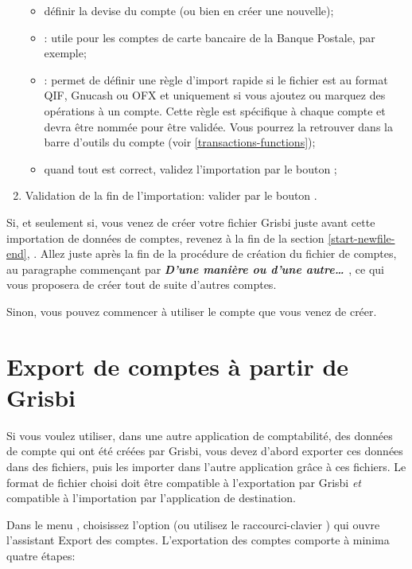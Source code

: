 \begin{enumerate}
\begin{itemize}
			\item définir la devise du compte (ou bien en créer une nouvelle);
			\item {}: utile pour les comptes de carte bancaire de la Banque Postale, par exemple;
			\item {}: permet de définir une règle d'import rapide si le fichier est au format \gls{QIF}, \gls{Gnucash} ou \gls{OFX} et uniquement si vous ajoutez ou marquez des opérations à un compte. Cette règle est spécifique à chaque compte et devra être nommée pour être validée. Vous pourrez la retrouver dans la barre d'outils du compte (voir \vref{transactions-functions});
			\item quand tout est correct, validez l'importation par le bouton ;
		\end{itemize}
	\item Validation de la fin de l'importation: valider par le bouton .
\end{enumerate}

Si, et seulement si, vous venez de créer votre fichier Grisbi juste avant cette importation de données de comptes, revenez à la fin de la section \vref{start-newfile-end}, . Allez juste après la fin de la procédure de création du fichier de comptes, au paragraphe commençant par \textbf{\emph{D'une manière ou d'une autre\ldots{ }}}, ce qui vous proposera de créer tout de suite d'autres comptes.

Sinon, vous pouvez commencer à utiliser le compte que vous venez de créer.


\section{Export de comptes à partir de Grisbi\label{importexport-export}}


Si vous voulez utiliser, dans une autre application de comptabilité, des données de compte qui ont été créées par Grisbi, vous devez d'abord exporter ces données dans des fichiers, puis les importer dans l'autre application grâce à ces fichiers. Le format de fichier choisi doit être compatible à l'exportation par Grisbi \emph{et} compatible à l'importation par l'application de destination.
 
Dans le menu , choisissez l'option   (ou utilisez le raccourci-clavier ) qui ouvre l'assistant Export des comptes. L'exportation des comptes comporte à minima quatre étapes:

